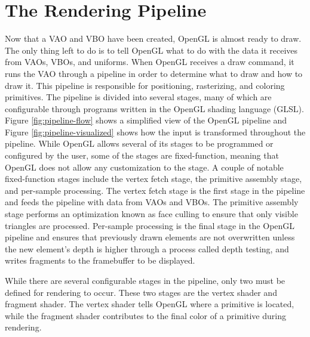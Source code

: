 \documentclass{article}
\begin{document}
\section{The Rendering Pipeline}
Now that a VAO and VBO have been created, OpenGL is almost ready to draw. The only thing left to do is to tell OpenGL what to do with the data it receives from VAOs, VBOs, and uniforms. When OpenGL receives a draw command, it runs the VAO through a pipeline in order to determine what to draw and how to draw it. This pipeline is responsible for positioning, rasterizing, and coloring primitives. The pipeline is divided into several stages, many of which are configurable through programs written in the OpenGL shading language (GLSL). Figure \ref{fig:pipeline-flow} shows a simplified view of the OpenGL pipeline and Figure \ref{fig:pipeline-visualized} shows how the input is transformed throughout the pipeline. While OpenGL allows several of its stages to be programmed or configured by the user, some of the stages are fixed-function, meaning that OpenGL does not allow any customization to the stage. A couple of notable fixed-function stages include the vertex fetch stage, the primitive assembly stage, and per-sample processing. The vertex fetch stage is the first stage in the pipeline and feeds the pipeline with data from VAOs and VBOs. The primitive assembly stage performs an optimization known as face culling to ensure that only visible triangles are processed. Per-sample processing is the final stage in the OpenGL pipeline and ensures that previously drawn elements are not overwritten unless the new element's depth is higher through a process called depth testing, and writes fragments to the framebuffer to be displayed. %

While there are several configurable stages in the pipeline, only two must be defined for rendering to occur. These two stages are the vertex shader and fragment shader. The vertex shader tells OpenGL where a primitive is located, while the fragment shader contributes to the final color of a primitive during rendering.
\end{document}
